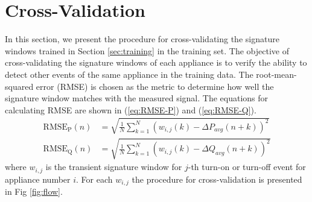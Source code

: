 \documentclass[conference]{IEEEtran}
\begin{document}
%





\section{Cross-Validation}\label{sec:cv}
In this section, we present the procedure for cross-validating the signature windows trained in Section \ref{sec:training} in the training set.  The objective of cross-validating the signature windows of each appliance is to verify the ability to detect other events of the same appliance in the training data.  The root-mean-squared error (RMSE) is chosen as the metric to determine how well the signature window matches with the measured signal.  The equations for calculating RMSE are shown in (\ref{eq:RMSE-P}) and (\ref{eq:RMSE-Q}).
\begin{align}
\label{eq:RMSE-P}
\text{RMSE}_{\text{P}}(n) &= \sqrt{\frac{1}{N}\sum\limits_{k=1}^{N}(w_{i,j}(k) - \Delta P_{avg}(n+k))^2}\\
\label{eq:RMSE-Q}
\text{RMSE}_{\text{Q}}(n) &= \sqrt{\frac{1}{N}\sum\limits_{k=1}^{N}(w_{i,j}(k) - \Delta Q_{avg}(n+k))^2}
\end{align}
where $w_{i,j}$ is the transient signature window for $j$-th turn-on or turn-off event for appliance number $i$.  For each $w_{i,j}$ the procedure for cross-validation is presented in Fig \ref{fig:flow}.
\end{document}

